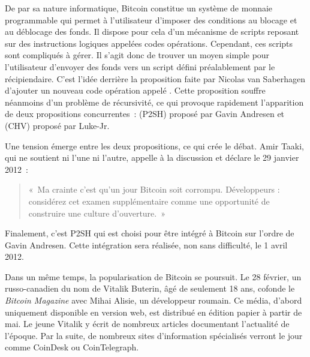 De par sa nature informatique, Bitcoin constitue un système de monnaie programmable qui permet à l'utilisateur d'imposer des conditions au blocage et au déblocage des fonds. Il dispose pour cela d'un mécanisme de scripts reposant sur des instructions logiques appelées codes opérations. Cependant, ces scripts sont compliqués à gérer. Il s'agit donc de trouver un moyen simple pour l'utilisateur d'envoyer des fonds vers un script défini préalablement par le récipiendaire. C'est l'idée derrière la proposition faite par Nicolas van Saberhagen d'ajouter un nouveau code opération appelé . Cette proposition souffre néanmoins d'un problème de récursivité, ce qui provoque rapidement l'apparition de deux propositions concurrentes~:  (P2SH) proposé par Gavin Andresen et  (CHV) proposé par Luke-Jr.

Une tension émerge entre les deux propositions, ce qui crée le débat. Amir Taaki, qui ne soutient ni l'une ni l'autre, appelle à la discussion et déclare le 29 janvier 2012~:

\begin{quote}
«~Ma crainte c'est qu'un jour Bitcoin soit corrompu. Développeurs : considérez cet examen supplémentaire comme une opportunité de construire une culture d'ouverture.~»
\end{quote} 

Finalement, c'est P2SH qui est choisi pour être intégré à Bitcoin sur l'ordre de Gavin Andresen. Cette intégration sera réalisée, non sans difficulté, le 1\ier{} avril 2012.


Dans un même temps, la popularisation de Bitcoin se poursuit. Le 28 février, un russo-canadien du nom de Vitalik Buterin, âgé de seulement 18 ans, cofonde le \emph{Bitcoin Magazine} avec Mihai Alisie, un développeur roumain. Ce média, d'abord uniquement disponible en version web, est distribué en édition papier à partir de mai. Le jeune Vitalik y écrit de nombreux articles documentant l'actualité de l'époque. Par la suite, de nombreux sites d'information spécialisés verront le jour comme CoinDesk ou CoinTelegraph.

